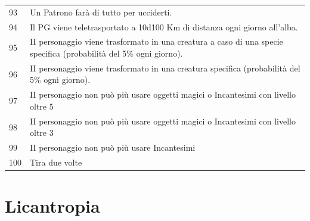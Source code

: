 \begin{tabularx}{0.98\textwidth}{lX}
93& Un Patrono farà di tutto per ucciderti.\\
94& Il PG viene teletrasportato a 10d100 Km di distanza ogni giorno all'alba.\\
95& II personaggio viene trasformato in una creatura a caso di una specie specifica (probabilità del 5\% ogni giorno).\\
96& II personaggio viene trasformato in una creatura specifica (probabilità del 5\% ogni giorno).\\
97& II personaggio non può più usare oggetti magici o Incantesimi con livello oltre 5\\
98& II personaggio non può più usare oggetti magici o Incantesimi con livello oltre 3\\
99& II personaggio non può più usare Incantesimi\\
100 & Tira due volte
\end{tabularx}

\pagebreak

\section*{Licantropia}\label{Licantropia}\hypertarget{Licantropia}{}


